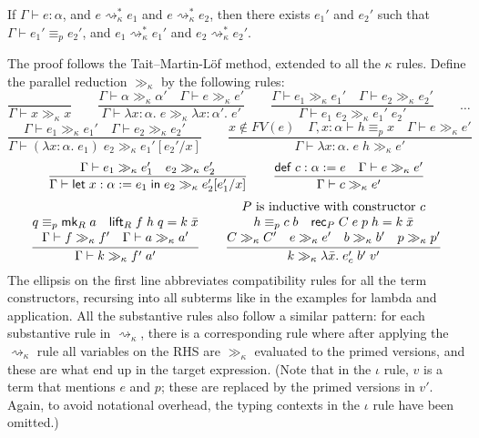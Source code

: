 \begin{theorem}\label{church_rosser}
If $\Gamma\vdash e:\alpha$, and $e\rightsquigarrow_\kappa^* e_1$ and $e\rightsquigarrow_\kappa^* e_2$, then there exists $e_1'$ and $e_2'$ such that $\Gamma\vdash e_1'\equiv_p e_2'$, and $e_1\rightsquigarrow_\kappa^* e_1'$ and $e_2\rightsquigarrow_\kappa^* e_2'$.
\end{theorem}
The proof follows the Tait--Martin-L\"{o}f method, extended to all the $\kappa$ rules. Define the parallel reduction $\gg_\kappa$ by the following rules:
$$\frac{}{\Gamma\vdash x\gg_\kappa x}\qquad
\frac{\Gamma\vdash \alpha\gg_\kappa\alpha'\quad \Gamma\vdash e\gg_\kappa e'}{\Gamma\vdash \lambda x:\alpha.\;e\gg_\kappa \lambda x:\alpha'.\;e'}\qquad
\frac{\Gamma\vdash e_1\gg_\kappa e_1'\quad \Gamma\vdash e_2\gg_\kappa e_2'}{\Gamma\vdash e_1\;e_2\gg_\kappa e_1'\;e_2'}\qquad\dots$$
$$\frac{\Gamma\vdash e_1\gg_\kappa e_1'\quad \Gamma\vdash e_2\gg_\kappa e_2'}{\Gamma\vdash (\lambda x:\alpha.\;e_1)\;e_2\gg_\kappa e_1'[e_2'/x]}\qquad
\frac{x\notin FV(e)\quad \Gamma,x:\alpha\vdash h\equiv_p x\quad \Gamma\vdash e\gg_\kappa e'}{\Gamma\vdash \lambda x:\alpha.\;e\;h\gg_\kappa e'}$$
$$\frac{\Gamma\vdash e_1\gg_\kappa e_1'\quad e_2\gg_\kappa e_2'}{\Gamma\vdash \elet{x:\alpha:=e_1}{e_2}\gg_\kappa e_2'[e_1'/x]}\qquad
\frac{\mathsf{def}\;c:\alpha:=e\quad \Gamma\vdash e\gg_\kappa e'}{\Gamma\vdash c\gg_\kappa e'}$$
$$\frac{\begin{matrix}
q\equiv_p \mk_R\;a\quad \lift_R\;f\;h\;q=k\;\bar x\\
\Gamma\vdash f\gg_\kappa f'\quad \Gamma\vdash a\gg_\kappa a'
\end{matrix}}{\Gamma\vdash k\gg_\kappa f'\;a'}\qquad
\frac{\begin{matrix}
P\mbox{ is inductive with constructor }c\\
h\equiv_p c\;b\quad
\rec_P\;C\;e\;p\;h=k\;\bar x\\
C\gg_\kappa C'\quad e\gg_\kappa e'\quad b\gg_\kappa b'\quad p\gg_\kappa p'
\end{matrix}}{k\gg_\kappa\lambda\bar x.\; e_c'\;b'\;v'}$$
The ellipsis on the first line abbreviates compatibility rules for all the term constructors, recursing into all subterms like in the examples for lambda and application. All the substantive rules also follow a similar pattern: for each substantive rule in $\rightsquigarrow_\kappa$, there is a corresponding rule where after applying the $\rightsquigarrow_\kappa$ rule all variables on the RHS are $\gg_\kappa$ evaluated to the primed versions, and these are what end up in the target expression. (Note that in the $\iota$ rule, $v$ is a term that mentions $e$ and $p$; these are replaced by the primed versions in $v'$. Again, to avoid notational overhead, the typing contexts in the $\iota$ rule have been omitted.)

